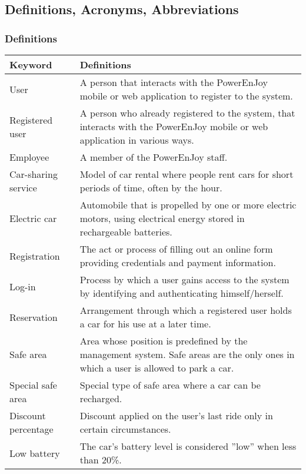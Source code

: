 \newpage
\subsection{Definitions, Acronyms, Abbreviations}
\subsubsection{Definitions}
\begin{center}
	\begin{tabular} { | m{4cm} | m{9cm} | }
		\hline
		\textbf{Keyword} & \textbf{Definitions}\\
		\hline
		User & A person that interacts with the PowerEnJoy mobile or web
		application to register to the system.\\
		\hline
		Registered user & A person who already registered to the system, that interacts with the PowerEnJoy mobile or web application in various ways.\\
		\hline
		Employee & A member of the PowerEnJoy staff.\\
		\hline
		Car-sharing service & Model of car rental where people rent cars for short periods of time, often by the hour.\\
		\hline
		Electric car & Automobile that is propelled by one or more electric motors, using electrical energy stored in rechargeable batteries.\\
		\hline
		Registration & The act or process of filling out an online form providing credentials and payment information.\\
		\hline
		Log-in & Process by which a user gains access to the system by identifying and authenticating himself/herself. \\
		\hline
		Reservation & Arrangement through which a registered user holds a car for his use at a later time.\\
		\hline
		Safe area & Area whose position is predefined by the management system. Safe areas are the only ones in which a user is allowed to park a car.\\
		\hline
		Special safe area & Special type of safe area where a car can be recharged.\\
		\hline
		Discount percentage & Discount applied on the user’s last ride only in certain circumstances.\\
		\hline
		Low battery & The car’s battery level is considered ”low” when less than 20\%.\\
		\hline
	\end{tabular}
\end{center}
\newpage
